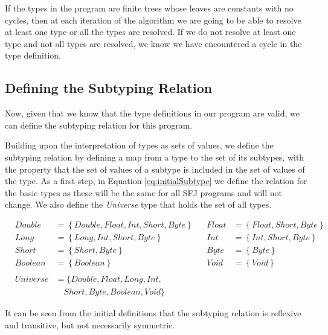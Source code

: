 \documentclass{l4proj}
\begin{document}
If the types in the program are finite trees whose leaves are constants with no cycles, then at each iteration of the algorithm we are going to be able to resolve at least one type or all the types are resolved.
If we do not resolve at least one type and not all types are resolved, we know we have encountered a cycle in the type definition.

\subsection{Defining the Subtyping Relation}
\label{sec:sub}

Now, given that we know that the type definitions in our program are valid, we can define the subtyping relation for this program.

Building upon the interpretation of types as sets of values, we define the subtyping relation by defining a map from a type to the set of its subtypes, with the property that the set of values of a subtype is included in the set of values of the type.
As a first step, in Equation \ref{eq:initialSubtype} we define the relation for the basic types as these will be the same for all SFJ programs and will not change.
We also define the \emph{Universe} type that holds the set of all types.

\begin{equation}
    \label{eq:initialSubtype}
    \begin{array}{llllll}
         & Double   & = \left\{Double, Float, Int, Short, Byte\right\} &  & Float & = \left\{Float, Short, Byte\right\} \\
         & Long     & =    \left\{Long, Int, Short, Byte\right\}       &  & Int   & = \left\{Int, Short, Byte\right\}   \\
         & Short    & =    \left\{Short, Byte\right\}                  &  & Byte  & = \left\{Byte\right\}               \\
         & Boolean  & =    \left\{Boolean\right\}                      &  & Void  & = \left\{Void\right\}               \\
        \\
         & Universe & = \{Double, Float, Long, Int,                                                                     \\
         &          & \quad Short, Byte, Boolean, Void\}
    \end{array}
\end{equation}

It can be seen from the initial definitions that the subtyping relation is reflexive and transitive, but not necessarily symmetric.
\end{document}

